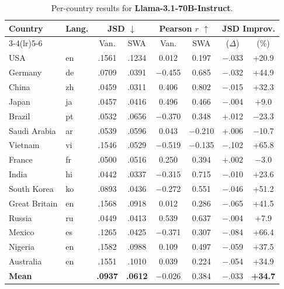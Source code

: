 \documentclass{article}
\newcommand{\gain}[1]{\textcolor{improvegreen}{#1}}
\newcommand{\loss}[1]{\textcolor{worsered}{#1}}
\begin{document}
\begin{table}[h]
\caption{Per-country results for \textbf{Llama-3.1-70B-Instruct}.}
\label{tab:llama70b_percountry}
\centering\setlength{\tabcolsep}{3.5pt}\footnotesize
\begin{tabular}{llcccccc}
\toprule
Country & Lang. & \multicolumn{2}{c}{JSD $\downarrow$} & \multicolumn{2}{c}{Pearson $r$ $\uparrow$} & \multicolumn{2}{c}{JSD Improv.} \\
\cmidrule(lr){3-4}\cmidrule(lr){5-6}
 & & Van. & SWA & Van. & SWA & ($\Delta$) & (\%) \\
\midrule
USA         & en & .1561 & .1234 & 0.012 & 0.197 & $-$.033 & \gain{+20.9} \\
Germany     & de & .0709 & .0391 & $-$0.455 & 0.685 & $-$.032 & \gain{+44.9} \\
China       & zh & .0459 & .0311 & 0.406 & 0.802 & $-$.015 & \gain{+32.3} \\
Japan       & ja & .0457 & .0416 & 0.496 & 0.466 & $-$.004 & \gain{+9.0} \\
Brazil      & pt & .0532 & .0656 & $-$0.370 & 0.348 & +.012  & \loss{$-$23.3} \\
Saudi Arabia& ar & .0539 & .0596 & 0.043 & $-$0.210 & +.006 & \loss{$-$10.7} \\
Vietnam     & vi & .1546 & .0529 & $-$0.519 & $-$0.135 & $-$.102 & \gain{+65.8} \\
France      & fr & .0500 & .0516 & 0.250 & 0.394 & +.002  & \loss{$-$3.0} \\
India       & hi & .0442 & .0337 & $-$0.315 & 0.715 & $-$.010 & \gain{+23.6} \\
South Korea & ko & .0893 & .0436 & $-$0.272 & 0.551 & $-$.046 & \gain{+51.2} \\
Great Britain& en& .1568 & .0918 & 0.012 & 0.286 & $-$.065 & \gain{+41.5} \\
Russia      & ru & .0449 & .0413 & 0.539 & 0.637 & $-$.004 & \gain{+7.9} \\
Mexico      & es & .1265 & .0425 & $-$0.371 & 0.307 & $-$.084 & \gain{+66.4} \\
Nigeria     & en & .1582 & .0988 & 0.109 & 0.497 & $-$.059 & \gain{+37.5} \\
Australia   & en & .1551 & .1010 & 0.039 & 0.224 & $-$.054 & \gain{+34.9} \\
\midrule
\textbf{Mean} & & \textbf{.0937} & \textbf{.0612} & $-$0.026 & 0.384 & $-$.033 & \gain{\textbf{+34.7}} \\
\bottomrule
\end{tabular}
\end{table}
\end{document}

